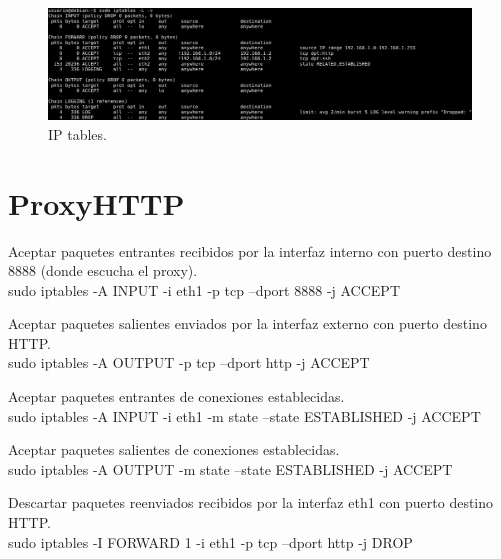 \documentclass[11pt]{article}
\begin{document}
      \begin{figure}[H]
        \centering
        \includegraphics[width = \textwidth]{iptables3}
        \caption{IP tables.}
      \end{figure}

  \section{ProxyHTTP}
    \par
    Aceptar paquetes entrantes recibidos por la interfaz interno con puerto
    destino 8888 (donde escucha el proxy).\\
    \vspace{2mm}
    sudo iptables -A INPUT -i eth1 -p tcp --dport 8888 -j ACCEPT

    \bigskip
    \par
    Aceptar paquetes salientes enviados por la interfaz externo con puerto
    destino HTTP.\\
    \vspace{2mm}
    sudo iptables -A OUTPUT -p tcp --dport http -j ACCEPT

    \bigskip
    \par
    Aceptar paquetes entrantes de conexiones establecidas.\\
    \vspace{2mm}
    sudo iptables -A INPUT -i eth1 -m state --state ESTABLISHED -j ACCEPT

    \bigskip
    \par
    Aceptar paquetes salientes de conexiones establecidas.\\
    \vspace{2mm}
    sudo iptables -A OUTPUT -m state --state ESTABLISHED -j ACCEPT

    \bigskip
    \par
    Descartar paquetes reenviados recibidos por la interfaz eth1 con puerto
    destino HTTP.\\
    \vspace{2mm}
    sudo iptables -I FORWARD 1 -i eth1 -p tcp --dport http -j DROP
\end{document}
